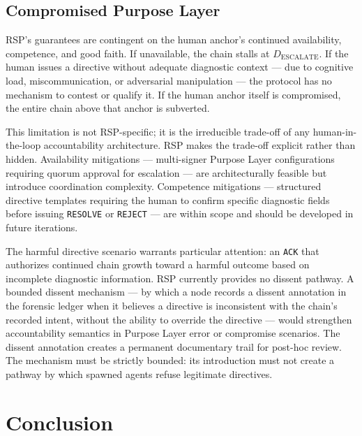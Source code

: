 \subsection{Compromised Purpose Layer}
\label{sec:rs-purpose-compromise}

RSP's guarantees are contingent on the human anchor's continued availability, competence, and good faith. If unavailable, the chain stalls at $D_{\text{ESCALATE}}$. If the human issues a directive without adequate diagnostic context --- due to cognitive load, miscommunication, or adversarial manipulation --- the protocol has no mechanism to contest or qualify it. If the human anchor itself is compromised, the entire chain above that anchor is subverted.

This limitation is not RSP-specific; it is the irreducible trade-off of any human-in-the-loop accountability architecture. RSP makes the trade-off explicit rather than hidden. Availability mitigations --- multi-signer Purpose Layer configurations requiring quorum approval for escalation --- are architecturally feasible but introduce coordination complexity. Competence mitigations --- structured directive templates requiring the human to confirm specific diagnostic fields before issuing \texttt{RESOLVE} or \texttt{REJECT} --- are within scope and should be developed in future iterations.

The harmful directive scenario warrants particular attention: an \texttt{ACK} that authorizes continued chain growth toward a harmful outcome based on incomplete diagnostic information. RSP currently provides no dissent pathway. A bounded dissent mechanism --- by which a node records a dissent annotation in the forensic ledger when it believes a directive is inconsistent with the chain's recorded intent, without the ability to override the directive --- would strengthen accountability semantics in Purpose Layer error or compromise scenarios. The dissent annotation creates a permanent documentary trail for post-hoc review. The mechanism must be strictly bounded: its introduction must not create a pathway by which spawned agents refuse legitimate directives.

\section{Conclusion}
\label{sec:rs-conclusion}

